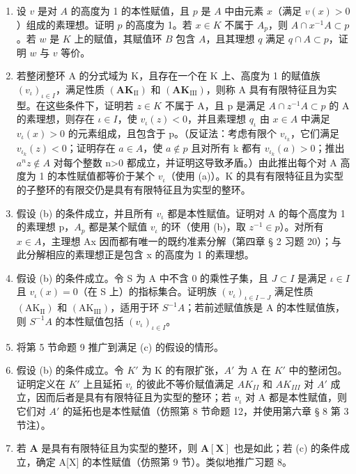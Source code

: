 \begin{enumerate}
\def\labelenumi{(\alph{enumi})}
\item
  设 \(v\) 是对 \(A\) 的高度为 1 的本性赋值，且 \(p\) 是 \(A\) 中由元素 \(x\)（满足 \(v(x) > 0\)）组成的素理想。证明 \(p\) 的高度为 1。若 \(x \in K\) 不属于 \(A_p\)，则 \(A \cap x^{-1}A \subset p\)。若 \(w\) 是 \(K\) 上的赋值，其赋值环 \(B\) 包含 \(A\)，且其理想 \(q\) 满足 \(q \cap A \subset p\)，证明 \(w\) 与 \(v\) 等价。
\item
  若整闭整环 A 的分式域为 K，且存在一个在 K 上、高度为 1 的赋值族 \((v_{\iota})_{\iota\in I}\)，满足性质 \((\mathbf{AK}_{\mathrm{II}})\) 和 \((\mathbf{AK}_{\mathrm{III}})\)，则称 A 具有有限特征且为实型。在这些条件下，证明若 \(z\in K\) 不属于 A，且 p 是满足 \(A\cap z^{-1}A\subset p\) 的 A 的素理想，则存在 \(\iota\in I\)，使 \(v_{\iota}(z)<0\)，并且素理想 \(q_{\iota}\) 由 \(x\in A\) 中满足 \(v_{\iota}(x)>0\) 的元素组成，且包含于 p。（反证法：考虑有限个 \(v_{\iota_{k}}\)，它们满足 \(v_{\iota_{k}}(z)<0\)；证明存在 \(a\in A\)，使 \(a\notin p\) 且对所有 k 都有 \(v_{\iota_{k}}(a)>0\)；推出 \(a^{n}z\notin A\) 对每个整数 n\textgreater0 都成立，并证明这导致矛盾。）由此推出每个对 A 高度为 1 的本性赋值都等价于某个 \(v_{\iota}\)（使用 (a)）。K 的具有有限特征且为实型的子整环的有限交仍是具有有限特征且为实型的整环。
\item
  假设 (b) 的条件成立，并且所有 \(v_{\iota}\) 都是本性赋值。证明对 A 的每个高度为 1 的素理想 p，\(A_{p}\) 都是某个赋值 \(v_{\iota}\) 的环（使用 (b)，取 \(z^{-1} \in p\)）。对所有 \(x \in A\)，主理想 Ax 因而都有唯一的既约准素分解（第四章 § 2 习题 20）；与此分解相应的素理想正是包含 x 的高度为 1 的素理想。
\item
  假设 (b) 的条件成立。令 S 为 A 中不含 0 的乘性子集，且 \(J \subset I\) 是满足 \(\iota \in I\) 且 \(v_{\iota}(x) = 0\)（在 S 上）的指标集合。证明族 \((v_{\iota})_{\iota \in I-J}\) 满足性质 \((\mathrm{AK}_{\mathrm{II}})\) 和 \((\mathrm{AK}_{\mathrm{III}})\)，适用于环 \(S^{-1}A\)；若前述赋值族是 A 的本性赋值族，则 \(S^{-1}A\) 的本性赋值包括 \((v_{\iota})_{\iota \in I}\)。
\item
将第 5 节命题 9 推广到满足 (c) 的假设的情形。
\item
  假设 (b) 的条件成立。令 \(K'\) 为 K 的有限扩张，\(A'\) 为 A 在 \(K'\) 中的整闭包。证明定义在 \(K'\) 上且延拓 \(v_{\iota}\) 的彼此不等价赋值满足 \(AK_{II}\) 和 \(AK_{III}\) 对 \(A'\) 成立，因而后者是具有有限特征且为实型的整环；若 \(v_{\iota}\) 对 A 都是本性赋值，则它们对 \(A'\) 的延拓也是本性赋值（仿照第 8 节命题 12，并使用第六章 § 8 第 3 节注）。
\item
  若 \(\mathbf{A}\) 是具有有限特征且为实型的整环，则 \(\mathbf{A}[\mathbf{X}]\) 也是如此；若 (c) 的条件成立，确定 A{[}X{]} 的本性赋值（仿照第 9 节）。类似地推广习题 8。
\end{enumerate}

